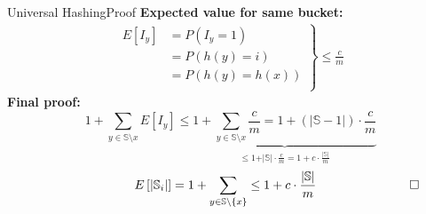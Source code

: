 \begin{frame}{Universal Hashing}{Proof}
  \textbf{Expected value for same bucket:}
  \begin{align*}
    \left.\begin{array}{rl}
      E[I_y] & = P(I_y = 1)\\
      {} & = P(h(y) = i)\\
      {} & = P(h(y) = h(x))\\
    \end{array}\right\rbrace
    \leq \frac{c}{m}
  \end{align*}
  \textbf{Final proof:}
  \begin{displaymath}
    1 + \sum_{y \in \mathbb{S} \setminus x} E[I_y]
    \leq
    \underbrace{
      1 + \sum_{y \in \mathbb{S} \setminus x} \frac{c}{m}
        = 1 + \left(\vert \mathbb{S} - 1 \vert \right) \cdot \frac{c}{m}
    }_{
      \displaystyle \leq 1 + \vert \mathbb{S} \vert \cdot \frac{c}{m}
        = 1 + c \cdot \frac{\vert \mathbb{S} \vert}{m}
    }
  \end{displaymath}
  \begin{displaymath}
    \hspace*{7.5em}
    E\left[\vert \mathbb{S}_i \vert\right]
      = 1 + \sum_{y \in \mathbb{S} \setminus \{x\}}
      \leq 1 + c \cdot \frac{\vert \mathbb{S} \vert}{m}
    \hspace*{7.5em}\square
  \end{displaymath}
\end{frame}
